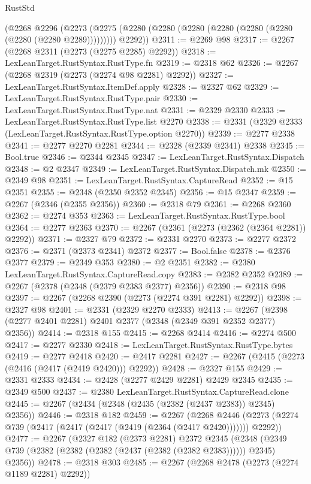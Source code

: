 \begin{lexlean}{RustStd}
\begin{coremodule}
    (@2268
      @2296
      (@2273 (@2275 (@2280 (@2280 (@2280 (@2280 (@2280 (@2280 (@2280 (@2280 @2289))))))))) @2292))
@2311 := @2269 @98
@2317 := @2267 (@2268 @2311 (@2273 (@2275 @2285) @2292))
@2318 := LexLeanTarget.RustSyntax.RustType.fn
@2319 := @2318 @62
@2326 := @2267 (@2268 @2319 (@2273 (@2274 @98 @2281) @2292))
@2327 := LexLeanTarget.RustSyntax.ItemDef.apply
@2328 := @2327 @62
@2329 := LexLeanTarget.RustSyntax.RustType.pair
@2330 := LexLeanTarget.RustSyntax.RustType.nat
@2331 := @2329 @2330
@2333 := LexLeanTarget.RustSyntax.RustType.list @2270
@2338 := @2331 (@2329 @2333 (LexLeanTarget.RustSyntax.RustType.option @2270))
@2339 := @2277 @2338
@2341 := @2277 @2270 @2281
@2344 := @2328 (@2339 @2341) @2338
@2345 := Bool.true
@2346 := @2344 @2345
@2347 := LexLeanTarget.RustSyntax.Dispatch
@2348 := @2 @2347
@2349 := LexLeanTarget.RustSyntax.Dispatch.mk
@2350 := @2349 @98
@2351 := LexLeanTarget.RustSyntax.CaptureRead
@2352 := @15 @2351
@2355 := @2348 (@2350 @2352 @2345)
@2356 := @15 @2347
@2359 := @2267 (@2346 (@2355 @2356))
@2360 := @2318 @79
@2361 := @2268 @2360
@2362 := @2274 @353
@2363 := LexLeanTarget.RustSyntax.RustType.bool
@2364 := @2277 @2363
@2370 := @2267 (@2361 (@2273 (@2362 (@2364 @2281)) @2292))
@2371 := @2327 @79
@2372 := @2331 @2270
@2373 := @2277 @2372
@2376 := @2371 (@2373 @2341) @2372
@2377 := Bool.false
@2378 := @2376 @2377
@2379 := @2349 @353
@2380 := @2 @2351
@2382 := @2380 LexLeanTarget.RustSyntax.CaptureRead.copy
@2383 := @2382 @2352
@2389 := @2267 (@2378 (@2348 (@2379 @2383 @2377) @2356))
@2390 := @2318 @98
@2397 := @2267 (@2268 @2390 (@2273 (@2274 @391 @2281) @2292))
@2398 := @2327 @98
@2401 := @2331 (@2329 @2270 @2333)
@2413 := @2267 (@2398 (@2277 @2401 @2281) @2401 @2377 (@2348 (@2349 @391 @2352 @2377) @2356))
@2414 := @2318 @155
@2415 := @2268 @2414
@2416 := @2274 @500
@2417 := @2277 @2330
@2418 := LexLeanTarget.RustSyntax.RustType.bytes
@2419 := @2277 @2418
@2420 := @2417 @2281
@2427 := @2267 (@2415 (@2273 (@2416 (@2417 (@2419 @2420))) @2292))
@2428 := @2327 @155
@2429 := @2331 @2333
@2434 := @2428 (@2277 @2429 @2281) @2429 @2345
@2435 := @2349 @500
@2437 := @2380 LexLeanTarget.RustSyntax.CaptureRead.clone
@2445 := @2267 (@2434 (@2348 (@2435 (@2382 (@2437 @2383)) @2345) @2356))
@2446 := @2318 @182
@2459 := @2267
    (@2268 @2446 (@2273 (@2274 @739 (@2417 (@2417 (@2417 (@2419 (@2364 (@2417 @2420))))))) @2292))
@2477 := @2267
    (@2327
      @182
      (@2373 @2281)
      @2372
      @2345
      (@2348 (@2349 @739 (@2382 (@2382 (@2382 (@2437 (@2382 (@2382 @2383)))))) @2345) @2356))
@2478 := @2318 @303
@2485 := @2267 (@2268 @2478 (@2273 (@2274 @1189 @2281) @2292))

\end{coremodule}
\end{lexlean}
